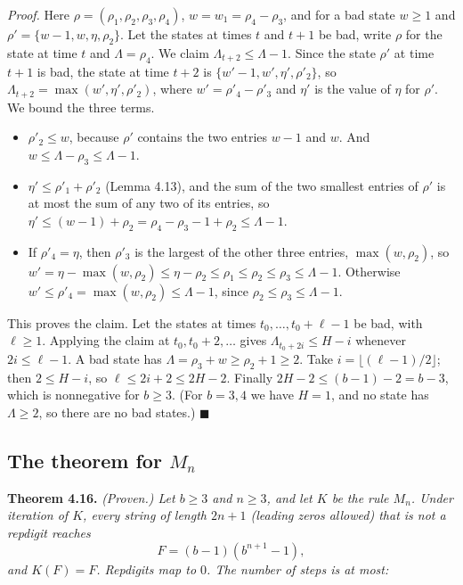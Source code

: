 \documentclass[11pt,letterpaper]{article}
\providecommand{\tightlist}{%
  \setlength{\itemsep}{0pt}\setlength{\parskip}{0pt}}
\theoremstyle{paperstyle}
\theoremstyle{paperstyledef}
\theoremstyle{paperstylerem}
\begin{document}
\emph{Proof.} Here \(\rho = (\rho_1, \rho_2, \rho_3, \rho_4)\), \(w = w_1 = \rho_4 - \rho_3\), and for a bad state \(w \geq 1\) and \(\rho' = \{w - 1, w, \eta, \rho_2\}\). Let the states at times \(t\) and \(t+1\) be bad, write \(\rho\) for the state at time \(t\) and \(\Lambda = \rho_4\). We claim \(\Lambda_{t+2} \leq \Lambda - 1\). Since the state \(\rho'\) at time \(t+1\) is bad, the state at time \(t+2\) is \(\{w' - 1, w', \eta', \rho'_2\}\), so \(\Lambda_{t+2} = \max(w', \eta', \rho'_2)\), where \(w' = \rho'_4 - \rho'_3\) and \(\eta'\) is the value of \(\eta\) for \(\rho'\). We bound the three terms.

\begin{itemize}
\tightlist
\item
  \(\rho'_2 \leq w\), because \(\rho'\) contains the two entries \(w - 1\) and \(w\). And \(w \leq \Lambda - \rho_3 \leq \Lambda - 1\).
\item
  \(\eta' \leq \rho'_1 + \rho'_2\) (Lemma 4.13), and the sum of the two smallest entries of \(\rho'\) is at most the sum of any two of its entries, so \(\eta' \leq (w - 1) + \rho_2 = \rho_4 - \rho_3 - 1 + \rho_2 \leq \Lambda - 1\).
\item
  If \(\rho'_4 = \eta\), then \(\rho'_3\) is the largest of the other three entries, \(\max(w, \rho_2)\), so \(w' = \eta - \max(w, \rho_2) \leq \eta - \rho_2 \leq \rho_1 \leq \rho_2 \leq \rho_3 \leq \Lambda - 1\). Otherwise \(w' \leq \rho'_4 = \max(w, \rho_2) \leq \Lambda - 1\), since \(\rho_2 \leq \rho_3 \leq \Lambda - 1\).
\end{itemize}

This proves the claim. Let the states at times \(t_0, \dots, t_0 + \ell - 1\) be bad, with \(\ell \geq 1\). Applying the claim at \(t_0, t_0 + 2, \dots\) gives \(\Lambda_{t_0 + 2i} \leq H - i\) whenever \(2i \leq \ell - 1\). A bad state has \(\Lambda = \rho_3 + w \geq \rho_2 + 1 \geq 2\). Take \(i = \lfloor (\ell-1)/2 \rfloor\); then \(2 \leq H - i\), so \(\ell \leq 2i + 2 \leq 2H - 2\). Finally \(2H - 2 \leq (b-1) - 2 = b - 3\), which is nonnegative for \(b \geq 3\). (For \(b = 3, 4\) we have \(H = 1\), and no state has \(\Lambda \geq 2\), so there are no bad states.) \(\blacksquare\)

\subsection{\texorpdfstring{The theorem for \(M_n\)}{The theorem for M\_n}}\label{the-theorem-for-m_n}

\textbf{Theorem 4.16.} \emph{(Proven.) Let \(b \geq 3\) and \(n \geq 3\), and let \(K\) be the rule \(M_n\). Under iteration of \(K\), every string of length \(2n+1\) (leading zeros allowed) that is not a repdigit reaches} \[F = (b-1)(b^{n+1} - 1),\] \emph{and \(K(F) = F\). Repdigits map to \(0\). The number of steps is at most:}
\end{document}
